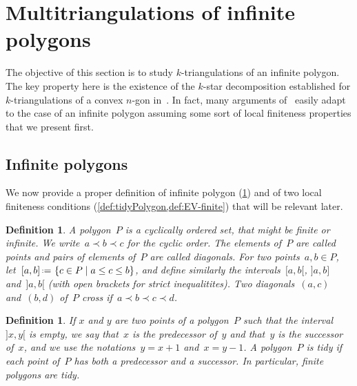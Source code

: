 \documentclass{amsart}
\newtheorem{definition}[theorem]{Definition}
\theoremstyle{remark}
\newcommand{\darkblue}{\color{darkblue}} %
\newcommand{\defn}[1]{\textsl{\darkblue #1}} %
\newcommand{\set}[2]{\left\{ #1 \;\middle|\; #2 \right\}} %
\newcommand{\eqdef}{\mbox{\,\raisebox{0.2ex}{\scriptsize\ensuremath{\mathrm:}}\ensuremath{=}\,}} %
\newcommand{\cl}{\prec}
\begin{document}

\section{Multitriangulations of infinite polygons}
\label{sec:infiniteMultitriangulations}

The objective of this section is to study $k$-triangulations of an infinite polygon.
The key property here is the existence of the $k$-star decomposition established for $k$-triangulations of a convex $n$-gon in~\cite{PilaudSantos-multitriangulations}.
In fact, many arguments of~\cite{PilaudSantos-multitriangulations} easily adapt to the case of an infinite polygon assuming some sort of local finiteness properties that we present first.


\subsection{Infinite polygons}

We now provide a proper definition of infinite polygon (\cref{def:infinitePolygon}) and of two local finiteness conditions (\cref{def:tidyPolygon,def:EV-finite}) that will be relevant later.

\begin{definition}
\label{def:infinitePolygon}
A \defn{polygon}~$P$ is a cyclically ordered set, that might be finite or infinite.
We write~$a \cl b \cl c$ for the cyclic order.
The elements of~$P$ are called \defn{points} and pairs of elements of~$P$ are called \defn{diagonals}.
For two points~$a,b \in P$, let~$[a,b] \eqdef \set{c \in P}{a \le c \le b}$, and define similarly the intervals~$[a,b[$, $]a,b]$ and~$]a,b[$ (with open brackets for strict inequalitites).
Two diagonals~$(a,c)$ and~$(b,d)$ of~$P$ \defn{cross} if~$a \cl b \cl c \cl d$.
\end{definition}

\begin{definition}
\label{def:tidyPolygon}
If $x$ and $y$ are two points of a polygon~$P$ such that the interval~$]x,y[$ is empty, we say that~$x$ is the \defn{predecessor} of~$y$ and that~$y$ is the \defn{successor} of~$x$, and we use the notations~$y = x+1$ and~$x = y-1$. A polygon~$P$ is \defn{tidy} if each point of~$P$ has both a predecessor and a successor. In particular, finite polygons are tidy.
\end{definition}
\end{document}
